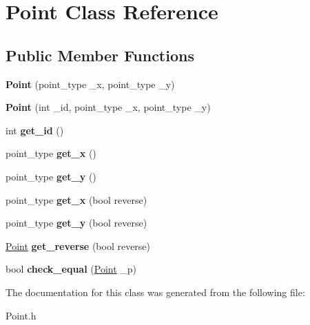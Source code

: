 \hypertarget{class_point}{}\section{Point Class Reference}
\label{class_point}
\subsection*{Public Member Functions}
\begin{DoxyCompactItemize}
\item 
\mbox{\label{class_point_ad8f1079982f7461b3cc34630a2e98f0f}} 
{\bfseries Point} (point\+\_\+type \+\_\+x, point\+\_\+type \+\_\+y)
\item 
\mbox{\label{class_point_a0d83a5f39af1e79ed1c2fbb8f932bef4}} 
{\bfseries Point} (int \+\_\+id, point\+\_\+type \+\_\+x, point\+\_\+type \+\_\+y)
\item 
\mbox{\label{class_point_a3e5a3dcf784dc5f7f05ed3e7b7431eb6}} 
int {\bfseries get\+\_\+id} ()
\item 
\mbox{\label{class_point_a9c4f65c8e8f1b6dc95fd85fe0cc802ed}} 
point\+\_\+type {\bfseries get\+\_\+x} ()
\item 
\mbox{\label{class_point_a21d79578bad99aff717a40803b565976}} 
point\+\_\+type {\bfseries get\+\_\+y} ()
\item 
\mbox{\label{class_point_a5322f1e6cbb4b3b2a2c02d2e331b0bc0}} 
point\+\_\+type {\bfseries get\+\_\+x} (bool reverse)
\item 
\mbox{\label{class_point_a77c3b8655a3a01b21b0319be346f71c8}} 
point\+\_\+type {\bfseries get\+\_\+y} (bool reverse)
\item 
\mbox{\label{class_point_a50003133c0ea92de019e72817e42df53}} 
\mbox{\hyperlink{class_point}{Point}} {\bfseries get\+\_\+reverse} (bool reverse)
\item 
\mbox{\label{class_point_ad0e4c839d5cda84a34321395012a7a4f}} 
bool {\bfseries check\+\_\+equal} (\mbox{\hyperlink{class_point}{Point}} \+\_\+p)
\end{DoxyCompactItemize}


The documentation for this class was generated from the following file\+:\begin{DoxyCompactItemize}
\item 
Point.\+h\end{DoxyCompactItemize}
